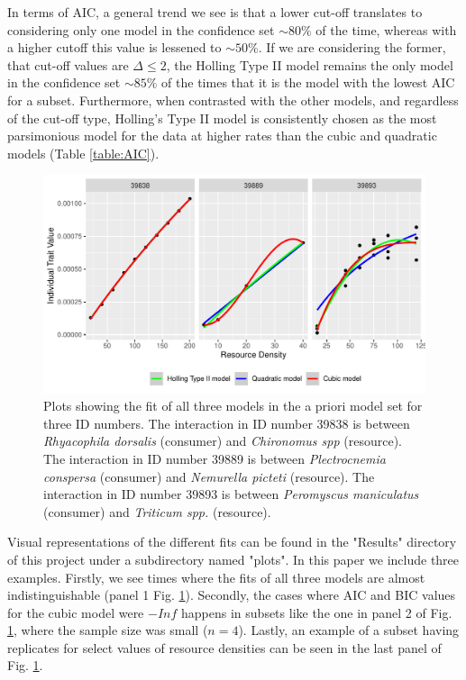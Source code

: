 \documentclass[11pt]{article}
\begin{document}
  In terms of AIC, a general trend we see is that a lower cut-off translates to considering only one model in the confidence set $\sim80\%$ of the time, whereas with a higher cutoff this value is lessened to $\sim50\%$. If we are considering the former, that cut-off values are $\Delta\leq2$, the Holling Type II model remains the only model in the confidence set $\sim85\%$ of the times that it is the model with the lowest AIC for a subset. Furthermore, when contrasted with the other models, and regardless of the cut-off type, Holling's Type II model is consistently chosen as the most parsimonious model for the data at higher rates than the cubic and quadratic models (Table \ref{table:AIC}).
  
  \begin{figure}[h]
    \centering
    \includegraphics[scale=0.8]{../Results/output_tables/plots.pdf}
    \caption{Plots showing the fit of all three models in the a priori model set for three ID numbers. The interaction in ID number 39838 is between \emph{Rhyacophila dorsalis} (consumer) and \emph{Chironomus spp} (resource). The interaction in ID number 39889 is between \emph{Plectrocnemia conspersa} (consumer) and \emph{Nemurella picteti} (resource). The interaction in ID number 39893 is between \emph{Peromyscus maniculatus} (consumer) and \emph{Triticum spp.} (resource).}
    \label{fig:egplots}
  \end{figure}

  Visual representations of the different fits can be found in the "Results" directory of this project under a subdirectory named "plots". In this paper we include three examples. Firstly, we see times where the fits of all three models are almost indistinguishable (panel 1 Fig. \ref{fig:egplots}). Secondly, the cases where AIC and BIC values for the cubic model were $-Inf$ happens in subsets like the one in panel 2 of Fig. \ref{fig:egplots}, where the sample size was small ($n=4$). Lastly, an example of a subset having replicates for select values of resource densities can be seen in the last panel of Fig. \ref{fig:egplots}.
  
\end{document}
